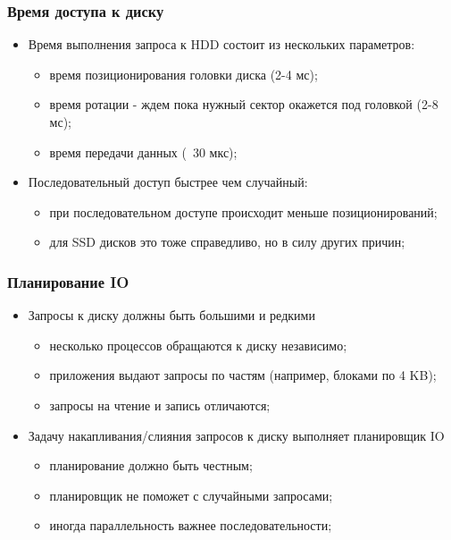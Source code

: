 \begin{frame}
\frametitle{Время доступа к диску}
\begin{itemize}
  \item<1-> Время выполнения запроса к HDD состоит из нескольких параметров:
    \begin{itemize}
      \item время позиционирования головки диска (2-4 мс);
      \item время ротации - ждем пока нужный сектор окажется под головкой (2-8 мс);
      \item время передачи данных (~30 мкс);
    \end{itemize}
  \item<2-> Последовательный доступ быстрее чем случайный:
    \begin{itemize}
      \item при последовательном доступе происходит меньше позиционирований;
      \item для SSD дисков это тоже справедливо, но в силу других причин;
    \end{itemize}
\end{itemize}
\end{frame}

\begin{frame}
\frametitle{Планирование IO}
\begin{itemize}
  \item<1-> Запросы к диску должны быть большими и редкими
    \begin{itemize}
      \item несколько процессов обращаются к диску независимо;
      \item приложения выдают запросы по частям (например, блоками по 4 KB);
      \item запросы на чтение и запись отличаются;
    \end{itemize}
  \item<2-> Задачу накапливания/слияния запросов к диску выполняет планировщик IO
    \begin{itemize}
      \item планирование должно быть честным;
      \item планировщик не поможет с случайными запросами;
      \item иногда параллельность важнее последовательности;
    \end{itemize}
\end{itemize}
\end{frame}
